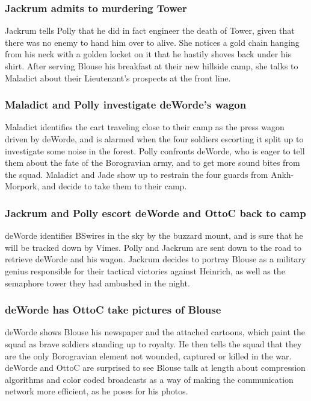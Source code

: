 \subsubsection{\Gls{Jackrum} admits to murdering \Gls{Tower}}
\Gls{Jackrum} tells \Gls{Polly} that he did in fact engineer the death of \Gls{Tower}, given that
there was no enemy to hand him over to alive. She notices a gold chain hanging from his neck with a
golden locket on it that he hastily shoves back under his shirt. After serving \Gls{Blouse} his
breakfast at their new hillside camp, she talks to \Gls{Maladict} about their Lieutenant's prospects
at the front line.

\subsubsection{\Gls{Maladict} and \Gls{Polly} investigate \Gls{deWorde}'s wagon}
\Gls{Maladict} identifies the cart traveling close to their camp as the press wagon driven by
\Gls{deWorde}, and is alarmed when the four soldiers escorting it split up to investigate some
noise in the forest. \Gls{Polly} confronts \Gls{deWorde}, who is eager to tell them about the fate
of the Borogravian army, and to get more sound bites from the squad. \Gls{Maladict} and \Gls{Jade}
show up to restrain the four guards from Ankh-Morpork, and decide to take them to their camp.

\subsubsection{\Gls{Jackrum} and \Gls{Polly} escort \Gls{deWorde} and \Gls{OttoC} back to camp}
\Gls{deWorde} identifies \Gls{BSwires} in the sky by the buzzard mount, and is sure that he will be
tracked down by \Gls{Vimes}. \Gls{Polly} and \Gls{Jackrum} are sent down to the road to retrieve
\Gls{deWorde} and his wagon. \Gls{Jackrum} decides to portray \Gls{Blouse} as a military genius
responsible for their tactical victories against \Gls{Heinrich}, as well as the semaphore tower they
had ambushed in the night.

\subsubsection{\Gls{deWorde} has \Gls{OttoC} take pictures of \Gls{Blouse}}
\Gls{deWorde} shows \Gls{Blouse} his newspaper and the attached cartoons, which paint the squad as
brave soldiers standing up to royalty. He then tells the squad that they are the only Borogravian
element not wounded, captured or killed in the war. \Gls{deWorde} and \Gls{OttoC} are surprised to
see \Gls{Blouse} talk at length about compression algorithms and color coded broadcasts as a way of
making the communication network more efficient, as he poses for his photos.

